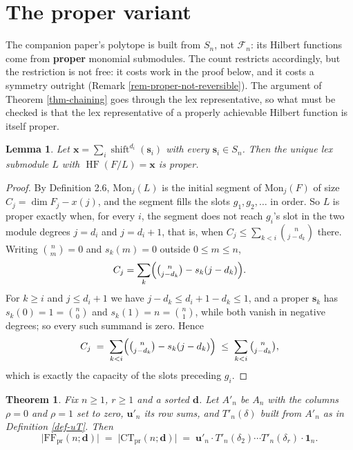 \documentclass[11pt, a4paper, abstract=yes]{scrartcl}
\theoremstyle{definition}
\theoremstyle{remark}
\theoremstyle{plain}
\newtheorem{lemma}[definition]{Lemma}
\newtheorem{theorem}[definition]{Theorem}
\newcommand{\vek}[1]{\boldsymbol{#1}}
\newcommand{\shift}{\operatorname{shift}}
\newcommand{\HF}{\operatorname{HF}}
\begin{document}
\section{The proper variant}
\label{sec-proper}
The companion paper's polytope is built from \(S_n\), not \(\mathcal F_n\): its Hilbert functions come
from \textbf{proper} monomial submodules. The count restricts accordingly, but the restriction is not free:
it costs work in the proof below, and it costs a symmetry outright (Remark
\ref{rem-proper-not-reversible}).
The argument of Theorem \ref{thm-chaining} goes through the lex representative, so what must be checked
is that the lex representative of a properly achievable Hilbert function is itself proper.

\begin{lemma}
Let \(\vek x=\sum_i\shift^{d_i}(\vek s_i)\) with every \(\vek s_i\in S_n\). Then the unique lex submodule
\(L\) with \(\HF(F/L)=\vek x\) is proper.
\label{lem-lexproper}
\end{lemma}

\begin{proof}
By Definition 2.6, \(\mathrm{Mon}_j(L)\) is the initial segment of \(\mathrm{Mon}_j(F)\) of size
\(C_j=\dim F_j-x(j)\), and the segment fills the slots \(g_1,g_2,\dots\) in order. So \(L\) is proper
exactly when, for every \(i\), the segment does not reach \(g_i\)'s slot in the two module degrees
\(j=d_i\) and \(j=d_i+1\), that is, when \(C_j\le\sum_{k<i}\binom n{j-d_k}\) there. Writing
\(\binom nm=0\) and \(s_k(m)=0\) outside \(0\le m\le n\),
\[
  C_j=\sum_k\Bigl(\tbinom n{j-d_k}-s_k(j-d_k)\Bigr).
\]
For \(k\ge i\) and \(j\le d_i+1\) we have \(j-d_k\le d_i+1-d_k\le1\), and a proper \(\vek s_k\) has
\(s_k(0)=1=\binom n0\) and \(s_k(1)=n=\binom n1\), while both vanish in negative degrees; so every
such summand is zero. Hence
\[
  C_j\;=\;\sum_{k<i}\Bigl(\tbinom n{j-d_k}-s_k(j-d_k)\Bigr)\;\le\;\sum_{k<i}\tbinom n{j-d_k} ,
\]
which is exactly the capacity of the slots preceding \(g_i\).
\end{proof}

\begin{theorem}
Fix \(n\ge1\), \(r\ge1\) and a sorted \(\vek d\). Let \(A'_n\) be \(A_n\) with the columns \(\rho=0\) and
\(\rho=1\) set to zero, \(\vek u'_n\) its row sums, and \(T'_n(\delta)\) built from \(A'_n\) as in
Definition \ref{def-uT}. Then
\begin{equation}\label{eq:auto-16}
  \lvert\mathrm{FF}_{\mathrm{pr}}(n;\vek d)\rvert
  \;=\;\lvert\mathrm{CT}_{\mathrm{pr}}(n;\vek d)\rvert
  \;=\;\vek u'_n\cdot T'_n(\delta_2)\cdots T'_n(\delta_r)\cdot\vek 1_n .
\end{equation}
\label{thm-proper}
\end{theorem}
\end{document}
